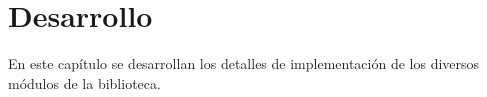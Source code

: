 \chapter{Desarrollo}
En este capítulo se desarrollan los detalles de implementación de los diversos módulos de la biblioteca.





